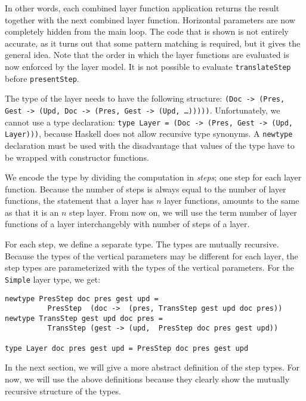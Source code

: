 In other words, each combined layer function application returns the result together with the next combined layer function. Horizontal parameters are now completely hidden from the main loop. The code that is shown is not entirely accurate, as it turns out that some pattern matching is required, but it gives the general idea. Note that the order in which the layer functions are evaluated is now enforced by the layer model. It is not possible to evaluate \texttt{translateStep} before \texttt{presentStep}.


The type of the layer needs to have the following structure: \texttt{(Doc -> (Pres, Gest -> (Upd, Doc -> (Pres, Gest -> (Upd, \dots)))))}. Unfortunately, we cannot use a type declaration: \texttt{type Layer = (Doc -> (Pres, Gest -> (Upd, Layer)))}, because Haskell does not allow recursive type synonyms. A \texttt{newtype} declaration must be used with the disadvantage that values of the type have to be wrapped with constructor functions.

We encode the type by dividing the computation in {\em steps}; one step for each layer function. Because the number of steps is always equal to the number of layer functions, the statement that a layer has $n$ layer functions, amounts to the same as that it is an $n$ step layer. From now on, we will use the term number of layer functions of a layer interchangebly with number of steps of a layer.

For each step, we define a separate type. The types are mutually recursive. Because the types of the vertical parameters may be different for each layer, the step types are parameterized with the types of the vertical parameters. For the \texttt{Simple} layer type, we get:

\begin{small}
\begin{verbatim}
newtype PresStep doc pres gest upd = 
          PresStep  (doc ->  (pres, TransStep gest upd doc pres))
newtype TransStep gest upd doc pres = 
          TransStep (gest -> (upd,  PresStep doc pres gest upd)) 

type Layer doc pres gest upd = PresStep doc pres gest upd
\end{verbatim}
\end{small}

In the next section, we will give a more abstract definition of the step types. For now, we will use the above definitions because they clearly show the mutually recursive structure of the types. 

